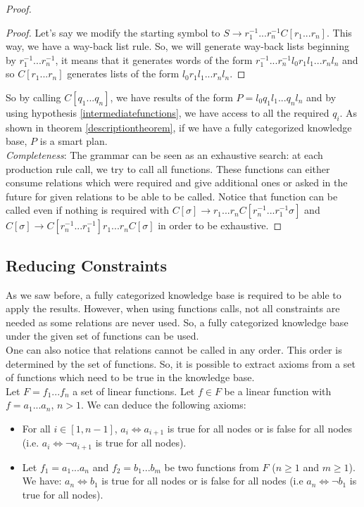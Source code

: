 \documentclass[10pt,a4paper,draft]{article}
\begin{document}
\begin{proof}
\begin{proof}
Let's say we modify the starting symbol to $S \rightarrow r_1^{-1} ... r_n^{-1} C[r_1 ... r_n]$. This way, we have a way-back list rule. So, we will generate way-back lists beginning by $r_1^{-1} ... r_n^{-1}$, it means that it generates words of the form $r_1^{-1} ... r_n^{-1} l_0 r_1 l_1 ... r_n l_n$ and so $C[r_1 ... r_n]$ generates lists of the form $l_0 r_1 l_1 ... r_n l_n$.
\end{proof}

So by calling $C[q_1 ... q_n]$, we have results of the form $P = l_0 q_1 l_1 ... q_n l_n$ and by using hypothesis \ref{intermediatefunctions}, we have access to all the required $q_i$. As shown in theorem \ref{descriptiontheorem}, if we have a fully categorized knowledge base, $P$ is a smart plan.\\

\textit{Completeness}: The grammar can be seen as an exhaustive search: at each production rule call, we try to call all functions. These functions can either consume relations which were required and give additional ones or asked in the future for given relations to be able to be called. Notice that function can be called even if nothing is required with $C[\sigma] \rightarrow r_1 ... r_n C[r_{n}^{-1} ... r_1^{-1} \sigma]$ and $C[\sigma] \rightarrow C[r_{n}^{-1} ... r_1^{-1}] r_1 ... r_n C[\sigma]$ in order to be exhaustive.
\end{proof}

\subsection{Reducing Constraints}

As we saw before, a fully categorized knowledge base is required to be able to apply the results. However, when using functions calls, not all constraints are needed as some relations are never used. So, a fully categorized knowledge base under the given set of functions can be used.\\
One can also notice that relations cannot be called in any order. This order is determined by the set of functions. So, it is possible to extract axioms from a set of functions which need to be true in the knowledge base.\\
Let $F = f_1 ... f_n$ a set of linear functions.
Let $f \in F$ be a linear function with $f = a_1 ... a_n$, $n > 1$. We can deduce the following axioms:
\begin{itemize}
\item For all $i \in [1, n-1]$, $a_i \Leftrightarrow a_{i+1}$ is true for all nodes or is false for all nodes (i.e. $a_i \Leftrightarrow \neg a_{i+1}$ is true for all nodes).
\item Let $f_1 = a_1 ... a_n$ and $f_2 = b_1 ... b_m$ be two functions from $F$ ($n \geq 1$ and $m \geq 1$). We have: $a_n \Leftrightarrow b_1$ is true for all nodes or is false for all nodes (i.e $a_n \Leftrightarrow \neg b_1$ is true for all nodes).
\end{itemize}
\end{document}
